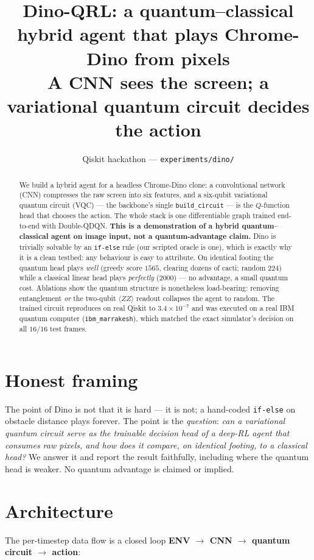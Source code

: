 \documentclass[10pt]{article}
\title{\textbf{Dino-QRL: a quantum--classical hybrid agent that plays Chrome-Dino from pixels}\\
\large A CNN sees the screen; a variational quantum circuit decides the action}
\author{Qiskit hackathon --- \texttt{experiments/dino/}}
\date{}
\begin{document}
\maketitle

\begin{abstract}
\noindent We build a hybrid agent for a headless Chrome-Dino clone: a convolutional network (CNN)
compresses the raw screen into six features, and a six-qubit variational quantum circuit (VQC) --- the
backbone's single \texttt{build\_circuit} --- is the $Q$-function head that chooses the action. The whole
stack is one differentiable graph trained end-to-end with Double-QDQN. \textbf{This is a demonstration of a
hybrid quantum--classical agent on image input, not a quantum-advantage claim.} Dino is trivially solvable
by an \texttt{if-else} rule (our scripted oracle is one), which is exactly why it is a clean testbed: any
behaviour is easy to attribute. On identical footing the quantum head plays \emph{well} (greedy score
$1565$, clearing dozens of cacti; random $224$) while a classical linear head plays \emph{perfectly}
($2000$) --- no advantage, a small quantum cost. Ablations show the quantum structure is nonetheless
load-bearing: removing entanglement \emph{or} the two-qubit $\langle ZZ\rangle$ readout collapses the agent
to random. The trained circuit reproduces on real Qiskit to $3.4\times10^{-7}$ and was executed on a real
IBM quantum computer (\texttt{ibm\_marrakesh}), which matched the exact simulator's decision on all $16/16$
test frames.
\end{abstract}

\section{Honest framing}
The point of Dino is not that it is hard --- it is not; a hand-coded \texttt{if-else} on obstacle distance
plays forever. The point is the \emph{question}: \emph{can a variational quantum circuit serve as the
trainable decision head of a deep-RL agent that consumes raw pixels, and how does it compare, on identical
footing, to a classical head?} We answer it and report the result faithfully, including where the quantum
head is weaker. No quantum advantage is claimed or implied.

\section{Architecture}
The per-timestep data flow is a closed loop \textbf{ENV $\to$ CNN $\to$ quantum circuit $\to$ action}:
\end{document}
